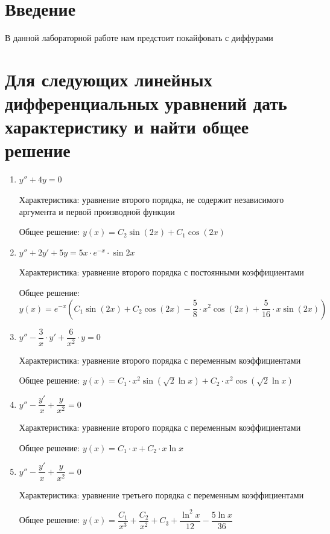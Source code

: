 \documentclass[14pt, a4paper]{extarticle}
\begin{document}
	
	\tableofcontents
	\pagebreak
	
	\section{Введение}
		В данной лабораторной работе нам предстоит покайфовать с диффурами
		\pagebreak
		
	\section{Для следующих линейных дифференциальных уравнений дать характеристику и найти общее решение}
		\begin{enumerate}
			\item \(y'' +4y = 0\)
			
				Характеристика: уравнение второго порядка, не содержит независимого аргумента и первой производной функции
				
				Общее решение: \(y (x) = C_2\sin{(2x)} + C_1\cos{(2x)}\)
				
			\item \(y'' + 2y' + 5y = 5x \cdot e^{-x} \cdot  \sin{2x}\)
			
				Характеристика: уравнение второго порядка с постоянными коэффициентами
			
				Общее решение: \[y (x) = e^{-x} \left(C_1\sin{(2x)} + C_2\cos{(2x)} - \dfrac{5}{8} \cdot x^2 \cos{(2x)} + \dfrac{5}{16} \cdot x \sin{(2x)}\right)\]
				
			\item \(y'' - \dfrac{3}{x} \cdot y' + \dfrac{6}{x^2} \cdot y = 0\)
			
				Характеристика: уравнение второго порядка с переменным коэффициентами
			
				Общее решение: \(y(x) = C_1 \cdot x^2 \sin{(\sqrt{2} \ln{x})} + C_2 \cdot x^2 \cos{(\sqrt{2} \ln{x})}\)
				
			\item \(y'' - \dfrac{y'}{x} + \dfrac{y}{x^2} = 0\)
			
				Характеристика: уравнение второго порядка с переменным коэффициентами
			
				Общее решение: \(y(x) = C_1 \cdot x + C_2 \cdot x \ln{x}\)
				
			\item \(y'' - \dfrac{y'}{x} + \dfrac{y}{x^2} = 0\)
			
				Характеристика: уравнение третьего порядка с переменным коэффициентами
			
				Общее решение: \(y(x) = \dfrac{C_1}{x^3} + \dfrac{C_2}{x^2} + C_3 + \dfrac{\ln^2{x}}{12} - \dfrac{5\ln{x}}{36}\)
		\end{enumerate}
		\pagebreak
			
\end{document}
